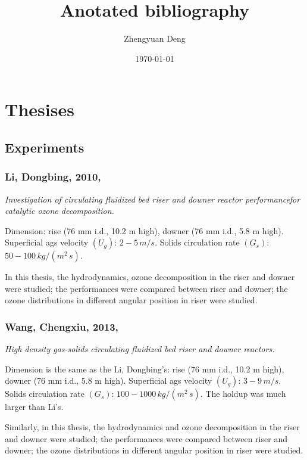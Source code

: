 \documentclass[12pt]{report}
\title{Anotated bibliography}
\author{Zhengyuan Deng}
\date{\today}
\begin{document}
\maketitle

\newpage
\tableofcontents
\chapter{Thesises}
\section{Experiments}
%
%
\subsection[Li, Dongbing, 2010]{Li, Dongbing, 2010, \cite{li2010}}
\textit{Investigation of circulating fluidized bed riser and downer reactor performancefor catalytic ozone decomposition.}

Dimension: rise (76 mm i.d., 10.2 m high), downer (76 mm i.d., 5.8 m high). Superficial ags velocity $(U_g)$: $2-5\,\si{m/s}$. Solids circulation rate $(G_s)$: $50-100\,\si{kg/(m^2\,s)}$.

In this thesis, the hydrodynamics, ozone decomposition in the riser and downer were studied; the performances were compared between riser and downer; the ozone distributions in different angular position in riser were studied.

%
%
\subsection{Wang, Chengxiu, 2013, \cite{wangcx2013}}
\textit{High density gas-solids circulating fluidized bed riser and downer reactors.}

Dimension is the same as the Li, Dongbing's: rise (76 mm i.d., 10.2 m high), downer (76 mm i.d., 5.8 m high). Superficial ags velocity $(U_g)$: $3-9\,\si{m/s}$. Solids circulation rate $(G_s)$: $100-1000\,\si{kg/(m^2\,s)}$. The holdup was much larger than Li's.

Similarly, in this thesis, the hydrodynamics and ozone decomposition in the riser and downer were studied; the performances were compared between riser and downer; the ozone distributions in different angular position in riser were studied.
\end{document}
